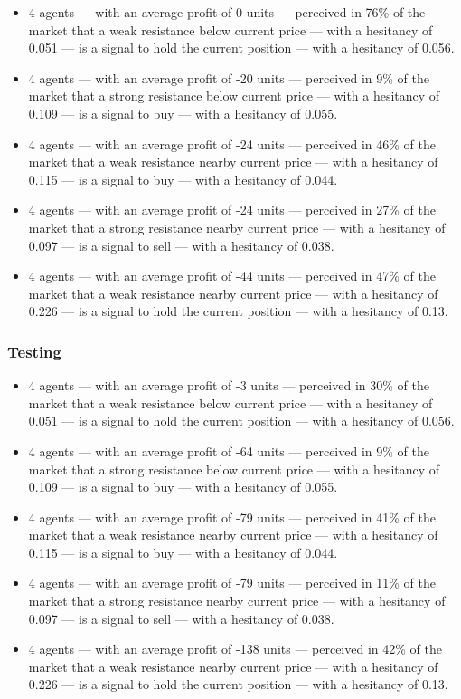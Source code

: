 {\small
  \begin{itemize}
  \item 4 agents — with an average profit of 0 units — perceived in 76\% of the
    market that a weak resistance below current price — with a hesitancy of
    0.051 — is a signal to hold the current position — with a hesitancy of
    0.056.
  \item 4 agents — with an average profit of -20 units — perceived in 9\% of the
    market that a strong resistance below current price — with a hesitancy of
    0.109 — is a signal to buy — with a hesitancy of 0.055.
  \item 4 agents — with an average profit of -24 units — perceived in 46\% of
    the market that a weak resistance nearby current price — with a hesitancy of
    0.115 — is a signal to buy — with a hesitancy of 0.044.
  \item 4 agents — with an average profit of -24 units — perceived in 27\% of
    the market that a strong resistance nearby current price — with a hesitancy
    of 0.097 — is a signal to sell — with a hesitancy of 0.038.
  \item 4 agents — with an average profit of -44 units — perceived in 47\% of
    the market that a weak resistance nearby current price — with a hesitancy of
    0.226 — is a signal to hold the current position — with a hesitancy of 0.13.
  \end{itemize}
}

\subsubsection{Testing}

{\small
  \begin{itemize}
  \item 4 agents — with an average profit of -3 units — perceived in 30\% of the
    market that a weak resistance below current price — with a hesitancy of
    0.051 — is a signal to hold the current position — with a hesitancy of
    0.056.
  \item 4 agents — with an average profit of -64 units — perceived in 9\% of the
    market that a strong resistance below current price — with a hesitancy of
    0.109 — is a signal to buy — with a hesitancy of 0.055.
  \item 4 agents — with an average profit of -79 units — perceived in 41\% of
    the market that a weak resistance nearby current price — with a hesitancy of
    0.115 — is a signal to buy — with a hesitancy of 0.044.
  \item 4 agents — with an average profit of -79 units — perceived in 11\% of
    the market that a strong resistance nearby current price — with a hesitancy
    of 0.097 — is a signal to sell — with a hesitancy of 0.038.
  \item 4 agents — with an average profit of -138 units — perceived in 42\% of
    the market that a weak resistance nearby current price — with a hesitancy of
    0.226 — is a signal to hold the current position — with a hesitancy of 0.13.
  \end{itemize}
}


